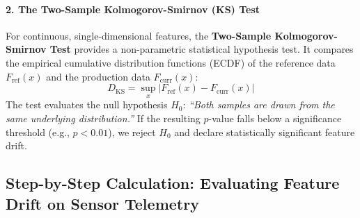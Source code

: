 \paragraph{2. The Two-Sample Kolmogorov-Smirnov (KS) Test}
For continuous, single-dimensional features, the \textbf{Two-Sample Kolmogorov-Smirnov Test} provides a non-parametric statistical hypothesis test. It compares the empirical cumulative distribution functions (ECDF) of the reference data $F_{\text{ref}}(x)$ and the production data $F_{\text{curr}}(x)$:
\begin{equation}
D_{\text{KS}} = \sup_{x} \left| F_{\text{ref}}(x) - F_{\text{curr}}(x) \right|
\end{equation}
The test evaluates the null hypothesis $H_0$: \emph{``Both samples are drawn from the same underlying distribution.''} If the resulting $p$-value falls below a significance threshold (e.g., $p < 0.01$), we reject $H_0$ and declare statistically significant feature drift.

\subsection{Step-by-Step Calculation: Evaluating Feature Drift on Sensor Telemetry}\label{subsec:psi_calculation}

